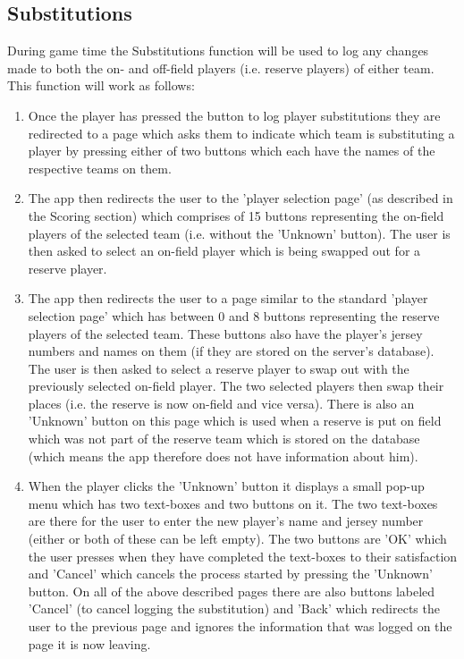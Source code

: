 \documentclass[hidelinks,a4paper,12pt]{article}
\begin{document}
	\subsection{Substitutions}
		During game time the Substitutions function will be used to log any changes made to both the on- and off-field players (i.e. reserve players) of either team. This function will work as follows:
		\begin{enumerate}
			\item Once the player has pressed the button to log player substitutions they are redirected to a page which asks them to indicate which team is substituting a player by pressing either of two buttons which each have the names of the respective teams on them.
			\item The app then redirects the user to the 'player selection page' (as described in the Scoring section) which comprises of 15 buttons representing the on-field players of the selected team (i.e. without the 'Unknown' button). The user is then asked to select an on-field player which is being swapped out for a reserve player.
			\item The app then redirects the user to a page similar to the standard 'player selection page' which has between 0 and 8 buttons representing the reserve players of the selected team. These buttons also have the player's jersey numbers and names on them (if they are stored on the server's database). The user is then asked to select a reserve player to swap out with the previously selected on-field player. The two selected players then swap their places (i.e. the reserve is now on-field and vice versa). There is also an 'Unknown' button on this page which is used when a reserve is put on field which was not part of the reserve team which is stored on the database (which means the app therefore does not have information about him).
			\item When the player clicks the 'Unknown' button it displays a small pop-up menu which has two text-boxes and two buttons on it. The two text-boxes are there for the user to enter the new player's name and jersey number (either or both of these can be left empty). The two buttons are 'OK' which the user presses when they have completed the text-boxes to their satisfaction and 'Cancel' which cancels the process started by pressing the 'Unknown' button.
	On all of the above described pages there are also buttons labeled 'Cancel' (to cancel logging the substitution) and 'Back' which redirects the user to the previous page and ignores the information that was logged on the page it is now leaving.


\end{enumerate}
\end{document}
